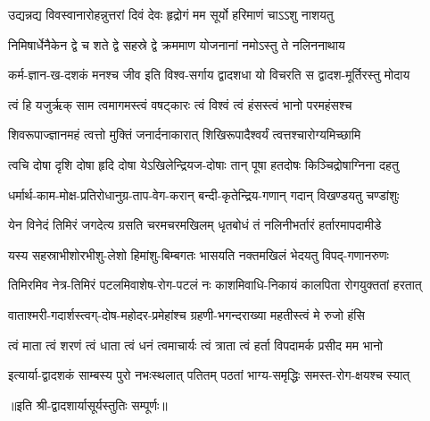 

\twolineshloka
{उद्यन्नद्य विवस्वानारोहन्नुत्तरां दिवं देवः}
{हृद्रोगं मम सूर्यो हरिमाणं चाऽऽशु नाशयतु}%

\twolineshloka
{निमिषार्धेनैकेन द्वे च शते द्वे सहस्रे द्वे}
{क्रममाण योजनानां नमोऽस्तु ते नलिननाथाय}%

\twolineshloka
{कर्म-ज्ञान-ख-दशकं मनश्च जीव इति विश्व-सर्गाय}
{द्वादशधा यो विचरति स द्वादश-मूर्तिरस्तु मोदाय}%

\twolineshloka
{त्वं हि यजुर्ऋक् साम त्वमागमस्त्वं वषट्कारः}
{त्वं विश्वं त्वं हंसस्त्वं भानो परमहंसश्च}%

\twolineshloka
{शिवरूपाज्ज्ञानमहं त्वत्तो मुक्तिं जनार्दनाकारात्}
{शिखिरूपादैश्वर्यं त्वत्तश्चारोग्यमिच्छामि}%

\twolineshloka
{त्वचि दोषा दृशि दोषा हृदि दोषा येऽखिलेन्द्रियज-दोषाः}
{तान् पूषा हतदोषः किञ्चिद्रोषाग्निना दहतु}%

\twolineshloka
{धर्मार्थ-काम-मोक्ष-प्रतिरोधानुग्र-ताप-वेग-करान्}
{बन्दी-कृतेन्द्रिय-गणान् गदान् विखण्डयतु चण्डांशुः}%

\twolineshloka
{येन विनेदं तिमिरं जगदेत्य ग्रसति चरमचरमखिलम्}
{धृतबोधं तं नलिनीभर्तारं हर्तारमापदामीडे}%

\twolineshloka
{यस्य सहस्राभीशोरभीशु-लेशो हिमांशु-बिम्बगतः}
{भासयति नक्तमखिलं भेदयतु विपद्-गणानरुणः}%

\twolineshloka
{तिमिरमिव नेत्र-तिमिरं पटलमिवाशेष-रोग-पटलं नः}
{काशमिवाधि-निकायं कालपिता रोगयुक्ततां हरतात्}%

\twolineshloka
{वाताश्मरी-गदार्शस्त्वग्-दोष-महोदर-प्रमेहांश्च}
{ग्रहणी-भगन्दराख्या महतीस्त्वं मे रुजो हंसि}%

\twolineshloka
{त्वं माता त्वं शरणं त्वं धाता त्वं धनं त्वमाचार्यः}
{त्वं त्राता त्वं हर्ता विपदामर्क प्रसीद मम भानो}%

\twolineshloka
{इत्यार्या-द्वादशकं साम्बस्य पुरो नभःस्थलात् पतितम्}
{पठतां भाग्य-समृद्धिः समस्त-रोग-क्षयश्च स्यात्}%


॥इति श्री-द्वादशार्यासूर्यस्तुतिः सम्पूर्णः॥